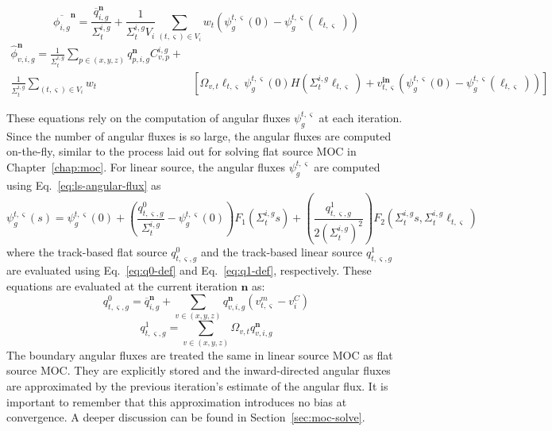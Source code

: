 \begin{equation}
\overline{\phi_{i,g}}^{\mathbf{n}} = \frac{\overline{q}_{i,g}^{\mathbf{n}}}{\Sigma_{t}^{i,g}} + \frac{1}{\Sigma_{t}^{i,g} V_i} \sum_{(t,\varsigma) \in V_i} w_t \left(\psi^{t,\varsigma}_g(0) - \psi^{t,\varsigma}_g(\ell_{t,\varsigma}) \right)
\label{eq:ls-avg-scalar-flux-iter}
\end{equation}
\begin{equation*}
\begin{split}
\hat{\phi}_{v,i,g}^{\mathbf{n}} = \frac{1}{\Sigma_{t}^{i,g}} \sum_{p \in (x,y,z)} q_{p,i,g}^{\mathbf{n}} C_{v,p}^{i,g} + & \\
\frac{1}{\Sigma_{t}^{i,g}} \sum_{(t,\varsigma) \in V_i} w_t & \left[\Omega_{v,t} \ell_{t,\varsigma} \psi^{t,\varsigma}_g(0) H(\Sigma_{t}^{i,g} \ell_{t,\varsigma}) + v^{\textbf{in}}_{t,\varsigma} \left(\psi^{t,\varsigma}_g(0) - \psi^{t,\varsigma}_g(\ell_{t,\varsigma}) \right)\right]
\end{split}
\label{eq:final-scalar-flux-moments-iter}
\end{equation*}

These equations rely on the computation of angular fluxes $\psi_g^{t,\varsigma}$ at each iteration. Since the number of angular fluxes is so large, the angular fluxes are computed on-the-fly, similar to the process laid out for solving flat source \ac{MOC} in Chapter~\ref{chap:moc}. For linear source, the angular fluxes $\psi_g^{t,\varsigma}$ are computed using Eq.~\ref{eq:ls-angular-flux} as
\begin{equation}
\psi_g^{t,\varsigma}(s) = \psi_g^{t,\varsigma}(0) + \left( \frac{q^0_{t,\varsigma,g}}{\Sigma_{t}^{i,g}} - \psi_g^{t,\varsigma}(0) \right) F_1\left(\Sigma_{t}^{i,g} s \right) + \left(\frac{q^1_{t,\varsigma,g}}{2\left(\Sigma_{t}^{i,g}\right)^2}\right) F_2\left(\Sigma_{t}^{i,g} s, \Sigma_{t}^{i,g} \ell_{t,\varsigma} \right)
\end{equation}
where the track-based flat source $q^0_{t,\varsigma,g}$ and the track-based linear source $q^1_{t,\varsigma,g}$ are evaluated using Eq.~\ref{eq:q0-def} and Eq.~\ref{eq:q1-def}, respectively. These equations are evaluated at the current iteration $\mathbf{n}$ as:
\begin{equation}
q^0_{t,\varsigma,g} = \overline{q}_{i,g}^{\mathbf{n}} + \sum_{v \in (x,y,z)} q_{v,i,g}^{\mathbf{n}} \left( v^m_{t,\varsigma} - v^C_i \right)
\end{equation}
\begin{equation}
q^1_{t,\varsigma,g} = \sum_{v \in (x,y,z)} \Omega_{v,t} q_{v,i,g}^{\mathbf{n}}
\end{equation}
The boundary angular fluxes are treated the same in linear source \ac{MOC} as flat source \ac{MOC}. They are explicitly stored and the inward-directed angular fluxes are approximated by the previous iteration's estimate of the angular flux. It is important to remember that this approximation introduces no bias at convergence. A deeper discussion can be found in Section~\ref{sec:moc-solve}.

